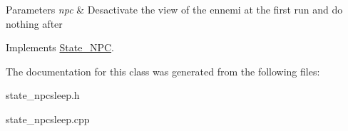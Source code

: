 \begin{DoxyParams}{Parameters}
{\em npc} & Desactivate the view of the ennemi at the first run and do nothing after \\
\hline
\end{DoxyParams}


Implements \hyperlink{class_state___n_p_c_a4123003789e88b4d40b47f49c6c84b04}{State\+\_\+\+N\+P\+C}.



The documentation for this class was generated from the following files\+:\begin{DoxyCompactItemize}
\item 
state\+\_\+npcsleep.\+h\item 
state\+\_\+npcsleep.\+cpp\end{DoxyCompactItemize}
